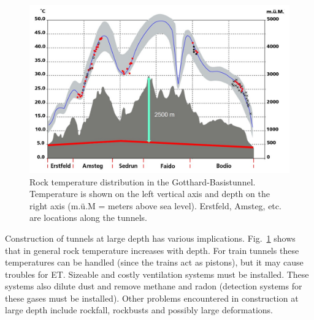 \begin{figure}[htbp!]
\centering
\includegraphics[width=14cm]{./Sec_SiteInfra/Figures/rocktemp.jpg}
\caption{Rock temperature distribution in the Gotthard-Basistunnel.
Temperature is shown on the left vertical axis and depth on the right axis
(m.\"u.M = meters above sea level). Erstfeld, Amsteg, etc. are locations
along the tunnels.}
\label{fig:rocktemp}
\end{figure}
Construction of tunnels at large depth has various implications. Fig.~\ref{fig:rocktemp}
shows that in general rock temperature increases with depth. For train tunnels
these temperatures can be handled (since the trains act as pistons), but it may
cause troubles for ET. Sizeable and costly ventilation systems must be installed. These
systems also dilute dust and remove methane and radon (detection systems
for these gases must be installed). Other problems encountered in construction
at large depth include rockfall, rockbusts and possibly large deformations.


